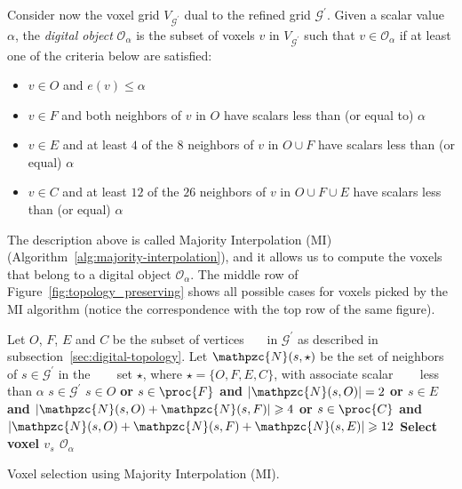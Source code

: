 Consider now the voxel grid $V_{\mathcal{G^\prime}}$ dual to the
refined grid $\mathcal{G}^\prime$.  Given a scalar value $\alpha$, the
\emph{digital object} $\mathcal{O}_\alpha$ is the subset of voxels $v$
in $V_{\mathcal{G^\prime}}$ such that $v\in\mathcal{O}_\alpha$ if at
least one of the criteria below are satisfied:
\begin{itemize}
\item $v\in O$ and $e(v)\leq\alpha$
\item $v\in F$ and both neighbors of $v$ in $O$ have scalars less than
  (or equal to) $\alpha$
\item $v\in E$ and at least $4$ of the $8$ neighbors of $v$ in $O\cup
  F$ have scalars less than (or equal) $\alpha$
\item $v\in C$ and at least $12$ of the $26$ neighbors of $v$ in
  $O\cup F\cup E$ have scalars less than (or equal) $\alpha$
\end{itemize}
The description above is called Majority Interpolation (MI) 
(Algorithm~\ref{alg:majority-interpolation}), and it allows us to compute
the voxels that belong to a digital object $\mathcal{O}_\alpha$.
The middle row of Figure~\ref{fig:topology_preserving} shows all
possible cases for voxels picked by the MI algorithm (notice the
correspondence with the top row of the same figure).

\begin{algorithm}[t]
\begin{codebox}
\li \Comment Let $O$, $F$, $E$ and $C$ be the subset of vertices 
\zi ~~~in $\mathcal{G}^\prime$ as described in
subsection~\ref{sec:digital-topology}. %
\li \Comment Let $\mathpzc{N}(s, \star)$ be the set of neighbors of
$s\in\mathcal{G}^\prime$ in the \zi ~~~ set $\star$, where $\star =
\{O, F, E, C\}$, with associate scalar \zi ~~~ less than $\alpha$
\li \For $s \in \mathcal{G}^\prime$
\li     \Do  	\If $s \in O$ \bf or
\li		    $s \in \proc{F}$ and $|\mathpzc{N}(s, O)| = 2$ \bf or
\li			  $s \in E$ and $|\mathpzc{N}(s, O)+\mathpzc{N}(s, F)| 
\geqslant 4$ \bf or
\li		    $s \in \proc{C}$ and $|\mathpzc{N}(s, O)+\mathpzc{N}(s,
F)+\mathpzc{N}(s,E)| \geqslant 12$
\li		\Then Select voxel $v_s$
		\End
	\End
\li \Return $\mathcal{O}_\alpha$
\end{codebox}
\caption{Voxel selection using Majority Interpolation (MI).
}
\label{alg:majority-interpolation}
\end{algorithm}

